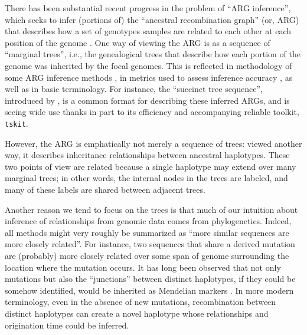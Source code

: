 \documentclass[10pt,twoside,lineno]{gsajnl}
\newcommand{\tskit}{\texttt{tskit}}
\begin{document}
There has been substantial recent progress
in the problem of ``ARG inference'',
which seeks to infer (portions of) the ``ancestral recombination graph'' (or, ARG)
that describes how a set of genotypes samples are related to each other
at each position of the genome \citep{speidel2019method,kelleher2019inferring,zhang2023biobankscale,deng2024robust,lewanski2024introduction}.
One way of viewing the ARG is as a sequence of ``marginal trees'',
i.e., the genealogical trees that describe how each portion of the genome
was inherited by the focal genomes.
This is reflected in methodology of some ARG inference methods \citep[e.g., Relate][]{speidel2019method},
in metrics used to assess inference accuracy \citep{XXX},
as well as in basic terminology.
For instance, 
the ``succinct tree sequence'',
introduced by \citet{kelleher2016efficient},
is a common format for describing these inferred ARGs,
and is seeing wide use thanks in part to its efficiency and accompanying reliable toolkit,
\tskit \citep{XXX}.

However, the ARG is emphatically not merely a sequence of trees:
viewed another way, it describes inheritance relationships between ancestral haplotypes.
These two points of view are related because a single haplotype
may extend over many marginal trees;
in other words, the internal nodes in the trees are labeled, and many of these labels
are shared between adjacent trees.

Another reason we tend to focus on the trees is that
much of our intuition about inference of relationships from genomic data
comes from phylogenetics.
Indeed, all methods might very roughly be summarized as
``more similar sequences are more closely related''.
For instance, two sequences that share a derived mutation
are (probably) more closely related over some span of genome surrounding the location where the mutation occurs.
It has long been observed 
that not only mutations
but also the ``junctions'' between distinct haplotypes,
if they could be somehow identified,
would be inherited as Mendelian markers
\citet{fisher1954fuller,chapman2003model}.
In more modern terminology, 
even in the absence of new mutations,
recombination between distinct haplotypes can create a novel haplotype
whose relationships and origination time could be inferred.
\end{document}
